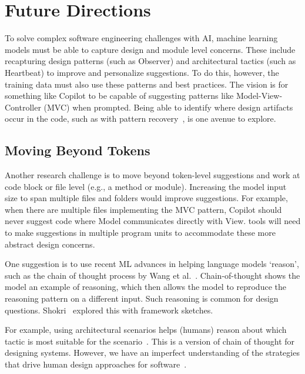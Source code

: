 \section{Future Directions}
\label{future}
To solve complex software engineering challenges with AI, machine learning models must be able to capture design and module level concerns. 
These include recapturing design patterns (such as Observer) and architectural tactics (such as Heartbeat) to improve and personalize suggestions. 
To do this, however, the training data must also use these patterns and best practices.
The vision is for something like Copilot to be capable of suggesting patterns like Model-View-Controller (MVC) when prompted. 
Being able to identify where design artifacts occur in the code, such as with pattern recovery~\cite{Keim2020}, is one avenue to explore. 

\subsection{Moving Beyond Tokens}
Another research challenge is to move beyond token-level suggestions and work at code block or file level (e.g., a method or module). 
Increasing the model input size to span multiple files and folders would improve suggestions. For example, when there are multiple files implementing the MVC pattern, Copilot should never suggest code where \textsf{Model} communicates directly with \textsf{View}. 
\AISE{} tools will need to make suggestions in multiple program units to accommodate these more abstract design concerns.

One suggestion is to use recent ML advances in helping language models `reason', such as the chain of thought process by Wang et al.~\cite{chain_of_thought}. 
Chain-of-thought shows the model an example of reasoning, which then allows the model to reproduce the reasoning pattern on a different input.
Such reasoning is common for design questions. 
Shokri~\cite{shokri21} explored this with framework sketches.

For example, using architectural scenarios helps (humans) reason about which tactic is most suitable for the scenario~\cite{kazman98}. This is a version of chain of thought for designing systems. 
However, we have an imperfect understanding of the strategies that drive human design approaches for software~\cite{Arab2022}. 